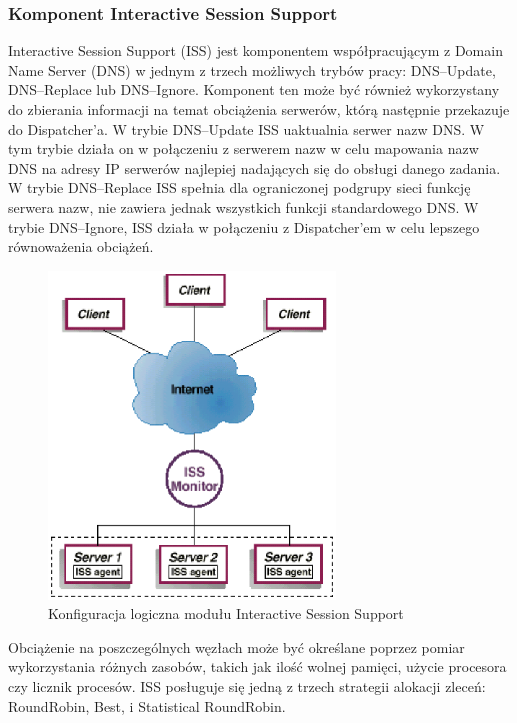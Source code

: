 \subsubsection{Komponent Interactive Session Support}

Interactive Session Support (ISS) jest komponentem współpracującym z Domain Name Server (DNS) w jednym z trzech możliwych 
trybów pracy: DNS--Update, DNS--Replace lub DNS--Ignore. Komponent ten może być również wykorzystany do zbierania informacji na 
temat obciążenia serwerów, którą następnie przekazuje do Dispatcher'a. W trybie DNS--Update ISS uaktualnia serwer nazw DNS. W 
tym trybie działa on w połączeniu z serwerem nazw w celu mapowania nazw DNS na adresy IP serwerów najlepiej nadających się do 
obsługi danego zadania. W trybie DNS--Replace ISS spełnia dla ograniczonej podgrupy sieci funkcję serwera nazw, nie zawiera 
jednak wszystkich funkcji standardowego DNS. W trybie DNS--Ignore, ISS działa w połączeniu z Dispatcher'em w celu lepszego 
równoważenia obciążeń.
\begin{figure}[h]
\centering
\includegraphics[width=3in]{./rysunki/ISS.eps}
\caption{Konfiguracja logiczna modułu Interactive Session Support}
\label{ISS}
\end{figure}

Obciążenie na poszczególnych węzłach może być określane poprzez pomiar wykorzystania różnych zasobów, takich jak ilość wolnej 
pamięci, użycie procesora czy licznik procesów. ISS posługuje się jedną z trzech strategii alokacji zleceń: RoundRobin, Best, 
i Statistical RoundRobin.

